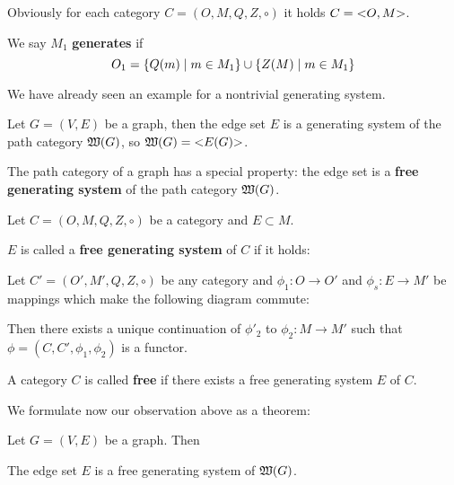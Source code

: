 Obviously for each category $C = (O, M, Q, Z, \circ)$ it holds $C =
\mbox{${<}{O},{M}{>}$}$.

\medskip
We say $M_1$ {\bf generates}  if 
\[ O_1 = \mbox{$\{Q(m) \mid m \in M_1\}$} \cup \mbox{$\{Z(M) \mid m \in M_1\}$} \]

We have already seen an example for a nontrivial generating system.

Let $G=(V,E)$ be a graph, then the edge set $E$ is a generating system of the
path category $\mbox{$\mathfrak{W}({G})$}$, so $\mbox{$\mathfrak{W}({G})$} = \mbox{${<}{E(G)}{>}$}$.

The path category of a graph has a special property: the edge set is a {\bf free
generating system} of the path category $\mbox{$\mathfrak{W}({G})$}$.

\bigskip
\begin{definition}
Let $C = (O, M, Q, Z, \circ)$ be a category and $E \subset M$.

$E$ is called a {\bf free generating system} of $C$ if it holds:

Let $C' = (O', M', Q, Z, \circ)$ be any category and $\phi_1: O \to O'$ and
$\phi_s : E \to M'$ be mappings which make the following diagram commute:

\begin{center}
\end{center}

Then there exists a unique continuation of $\phi'_2$ to $\phi_2 : M \to M'$ such
that $\phi = (C, C', \phi_1, \phi_2)$ is a functor.
\end{definition}

\bigskip
\begin{definition}
A category $C$ is called {\bf free} if there exists a free generating system $E$
of $C$.
\end{definition}

We formulate now our observation above as a theorem:

\begin{theorem}
Let $G=(V, E)$ be a graph. Then
\begin{center}
The edge set $E$ is a free generating system of $\mbox{$\mathfrak{W}({G})$}$.
\end{center}
\end{theorem}

